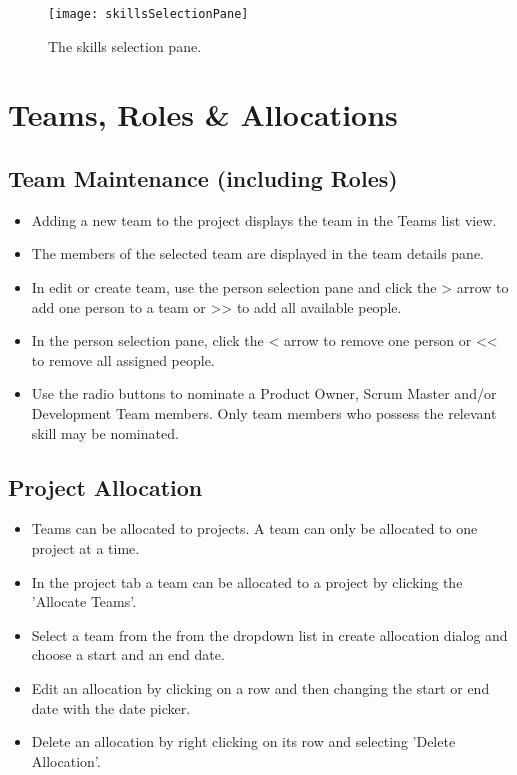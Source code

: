 \documentclass[11pt,fleqn]{book} %
\begin{document}
\begin{figure}[H]
  \centering
  \texttt{[image: skillsSelectionPane]}
  \caption{The skills selection pane.\label{skillsSelectionPane}}
\end{figure}

\section{Teams, Roles \& Allocations}
\subsection{Team Maintenance (including Roles)}
\begin{itemize}
  \item Adding a new team to the project displays the team in the Teams list view.
  \item The members of the selected team are displayed in the team details pane.
  \item In edit or create team, use the person selection pane and click the > arrow to add one person to a team
  or >> to add all available people.
  \item In the person selection pane, click the < arrow to remove one person or << to remove all assigned people.
  \item Use the radio buttons to nominate a Product Owner, Scrum Master and/or Development Team members. Only team members who
   possess the relevant skill may be nominated.
\end{itemize}

\subsection{Project Allocation}
\begin{itemize}
  \item Teams can be allocated to projects. A team can only be allocated to one project at a time.
  \item In the project tab a team can be allocated to a project by clicking the 'Allocate Teams'.
  \item Select a team from the from the dropdown list in create allocation dialog and choose a start and an end date.
  \item Edit an allocation by clicking on a row and then changing the start or end date with the date picker.
  \item Delete an allocation by right clicking on its row and selecting 'Delete Allocation'.
\end{itemize}
\end{document}
